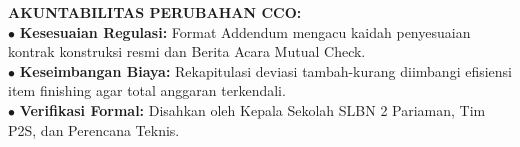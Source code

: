 \documentclass[10pt,a4paper,landscape]{article}
\begin{document}
\begin{minipage}[t]{0.30\linewidth}
  \begin{tcolorbox}[sharp corners, boxrule=0.6pt, colframe=pnavy, colback=pbglight, left=2.5mm, right=2.5mm, top=2mm, bottom=2mm, height=54mm]
    {\fontsize{7pt}{8.5pt}\selectfont\bfseries\color{pnavy}AKUNTABILITAS PERUBAHAN CCO:}\\[1.5mm]
    {\fontsize{6.5pt}{8.2pt}\selectfont\color{psteel}
    $\bullet$ \textbf{Kesesuaian Regulasi:} Format Addendum mengacu kaidah penyesuaian kontrak konstruksi resmi dan Berita Acara Mutual Check.\\
    $\bullet$ \textbf{Keseimbangan Biaya:} Rekapitulasi deviasi tambah-kurang diimbangi efisiensi item finishing agar total anggaran terkendali.\\
    $\bullet$ \textbf{Verifikasi Formal:} Disahkan oleh Kepala Sekolah SLBN 2 Pariaman, Tim P2S, dan Perencana Teknis.
    }
  \end{tcolorbox}
\end{minipage}%
\hfill
\end{document}
